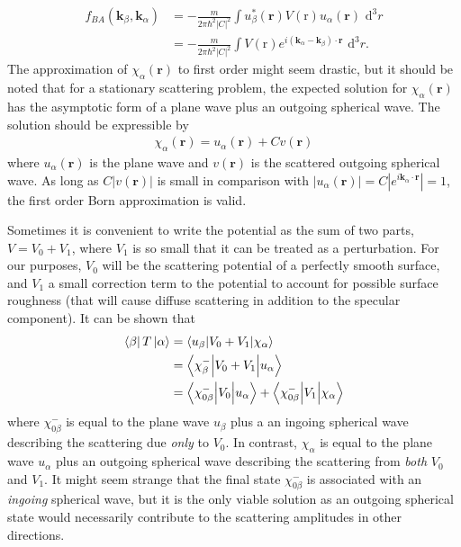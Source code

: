 \documentclass[10pt,twoside, b5paper,pdftex]{report}
\newcommand{\bra}[1]{\ensuremath{\left\langle#1\right|}}
\newcommand{\ket}[1]{\ensuremath{\left|#1\right\rangle}}
\newcommand{\matrixel}[3]{\ensuremath{\left\langle #1 \middle| #2 \middle| #3 \right\rangle}}
\begin{document}
\begin{align}
	f_{BA}(\mathbf{k}_{\beta},\mathbf{k}_{\alpha}) &= -\frac{m}{2\pi\hbar^2|C|^2}\int u_{\beta}^{*}( \mathbf{r}) V(\mbox{r}) u_{\alpha}( \mathbf{r}) \mbox{ d}^{3}r\\
	&= -\frac{m}{2\pi\hbar^2|C|^2}\int  V(\mbox{r}) e^{i(\mathbf{k}_{\alpha}-\mathbf{k}_{\beta}) \cdot \mathbf{r}} \mbox{ d}^{3}r.
\end{align}
The approximation of $\chi_{\alpha}(\mathbf{r})$ to first order might seem drastic, but it should be noted that for a stationary scattering problem, the expected solution for  $\chi_{\alpha}(\mathbf{r})$ has the asymptotic form of a plane wave plus an outgoing spherical wave. The solution should be expressible by
\begin{align}
	\chi_{\alpha}(\mathbf{r}) = u_{\alpha}(\mathbf{r}) + C v(\mathbf{r})
\end{align}
where $u_{\alpha}(\mathbf{r})$ is the plane wave and $v(\mathbf{r})$ is the scattered outgoing spherical wave. As long as $C|v(\mathbf{r})|$ is small in comparison with $|u_{\alpha}(\mathbf{r})| = C|e^{i\mathbf{k}_{\alpha}\cdot\mathbf{r}}| = 1$, the first order Born approximation is valid. 

Sometimes it is convenient to write the potential as the sum of two parts, $V=V_{0}+V_{1}$, where $V_{1}$ is so small that it can be treated as a perturbation. For our purposes, $V_{0}$ will be the scattering potential of a perfectly smooth surface, and $V_{1}$ a small correction term to the potential to account for possible surface roughness (that will cause diffuse scattering in addition to the specular component). It can be shown that
\begin{align}
  \bra{\beta}T\ket{\alpha} &= \matrixel{ u_{\beta}}{V_{0} + V_{1}}{\chi_{\alpha}}\notag \\
  &= \matrixel{\chi_{\beta}^{-}}{V_{0} + V_{1}}{u_{\alpha}}\notag \\
  &= \matrixel{\chi_{0\beta}^{-}}{V_{0}}{u_{\alpha}} + \matrixel{\chi_{0\beta}^{-}}{V_{1}}{\chi_{\alpha}} \label{eq:dwba_precore}
\end{align} 
where $\chi_{0\beta}^{-}$ is equal to the plane wave $u_{\beta}$ plus a an ingoing spherical wave describing the scattering due {\it only} to $V_{0}$. In contrast, $\chi_{\alpha}$ is equal to the plane wave $u_{\alpha}$ plus an outgoing spherical wave describing the scattering from {\it  both} $V_{0}$ and $V_{1}$. It might seem strange that the final state $\chi_{0\beta}^{-}$ is associated with an {\it ingoing} spherical wave, but it is the only viable solution as an outgoing spherical state would necessarily contribute to the scattering amplitudes in other directions. 
\end{document}

